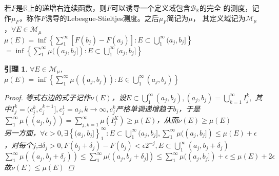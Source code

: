 \documentclass[12pt, a4paper, oneside]{ctexbook}
\newtheorem{lemma}[theorem]{引理}
\begin{document}
若$F$是$\mathbb{R}$上的递增右连续函数，则$F$可以诱导一个定义域包含$\mathcal{B}_{\mathbb{R}}$的完全
的测度，记作$\mu_F$，称作$F$诱导的Lebesgue-Stieltjes测度。之后$\mu_F$简记为$\mu$，
其定义域记为$\mathcal{M}_{\mu}$，$\forall E\in\mathcal{M}_{\mu}$\\
$\mu(E)=\inf\left\{\sum_1^{\infty}[F(b_j)-F(a_j)]:E\subset\bigcup_1^{\infty}(a_j,b_j]\right\}$\\
$=\inf\left\{\sum_1^{\infty}\mu((a_j,b_j]):E\subset\bigcup_1^{\infty}(a_j,b_j]\right\}$\\
\begin{lemma}
    $\forall E\in\mathcal{M}_{\mu}$,\\
    $\mu(E)=\inf\left\{\sum_1^{\infty}\mu((a_j,b_j)):E\in\bigcup_1^{\infty}(a_j,b_j)\right\}$
    \begin{proof}
        等式右边的式子记作$\nu(E)$，设$E\subset\bigcup_1^{\infty}(a_j,b_j),(a_j,b_j)=\bigcup_{k=1}^{\infty}I_j^k,$
        其中$I_j^k=(c_j^k,c_j^{k+1}],c_j^1=a_j,k\to\infty,c_j^k$严格单调递增趋于$b_j$，于是\\
        $\sum_1^{\infty}\mu((a_j,b_j))=\sum_{j,k=1}^{\infty}\mu(I_j^K)\geq\mu(E)$，从而$\nu(E)\geq\mu(E)$\\
        另一方面，$\forall\epsilon>0,\exists\left\{(a_j,b_j]\right\}_1^{\infty}:E\subset\bigcup_1^{\infty}(a_j,b_j],\sum_1^{\infty}\mu((a_j,b_j])\leq\mu(E)+
        \epsilon$，对每个$j$,$\exists \delta_j>0,F(b_j+\delta_j)-F(b_j)<\epsilon2^{-j},E\subset\bigcup_1^{\infty}(a_j,b_j+\delta_j)$\\
        $\sum_1^{\infty}\mu((a_j,b_j+\delta_j))\leq\sum_1^{\infty}\mu((a_j,b_j+\delta_j])\leq\sum_1^{\infty}\mu((a_j,b_j])+\epsilon\leq\mu(E)+2\epsilon$\\
        故$\nu(E)\leq\mu(E)$
    \end{proof}
\end{lemma}
\end{document}
